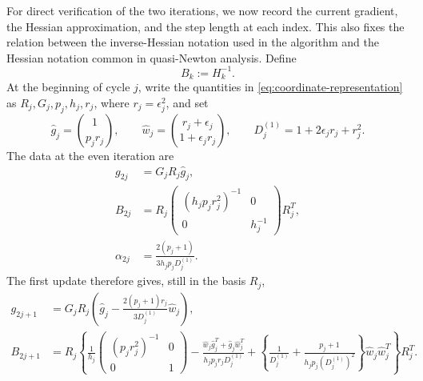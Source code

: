 \documentclass[11pt]{article}
\begin{document}
For direct verification of the two iterations, we now record the current
gradient, the Hessian approximation, and the step length at each index.  This
also fixes the relation between the inverse-Hessian notation used in the
algorithm and the Hessian notation common in quasi-Newton analysis.  Define
\[
B_k:=H_k^{-1}.
\]
At the beginning of cycle $j$, write the quantities in
\eqref{eq:coordinate-representation} as
$R_j,G_j,p_j,h_j,r_j$, where $r_j=\epsilon_j^2$, and set
\[
\widehat g_j=\binom{1}{p_jr_j},\qquad
\widehat w_j=\binom{r_j+\epsilon_j}{1+\epsilon_jr_j},\qquad
D_j^{(1)}=1+2\epsilon_jr_j+r_j^2.
\]
The data at the even iteration are
\begin{equation}\label{eq:even-iteration-data}
\begin{aligned}
g_{2j}&=G_jR_j\widehat g_j,\\
B_{2j}&=R_j
\begin{pmatrix}
(h_jp_jr_j^2)^{-1}&0\\[1mm]
0&h_j^{-1}
\end{pmatrix}R_j^T,\\
\alpha_{2j}
&=\frac{2(p_j+1)}{3h_jp_jD_j^{(1)}}.
\end{aligned}
\end{equation}
The first update therefore gives, still in the basis $R_j$,
\begin{align}
g_{2j+1}
&=G_jR_j\left(
\widehat g_j-
\frac{2(p_j+1)r_j}{3D_j^{(1)}}\widehat w_j
\right),
\label{eq:first-updated-gradient}\\
B_{2j+1}
&=R_j\left\{
\frac1{h_j}
\begin{pmatrix}(p_jr_j^2)^{-1}&0\\0&1\end{pmatrix}
-\frac{\widehat w_j\widehat g_j^T+
\widehat g_j\widehat w_j^T}
{h_jp_jr_jD_j^{(1)}}
+\left\{\frac1{D_j^{(1)}}
+\frac{p_j+1}{h_jp_j(D_j^{(1)})^2}\right\}
\widehat w_j\widehat w_j^T
\right\}R_j^T.
\label{eq:first-updated-B}
\end{align}
\end{document}
